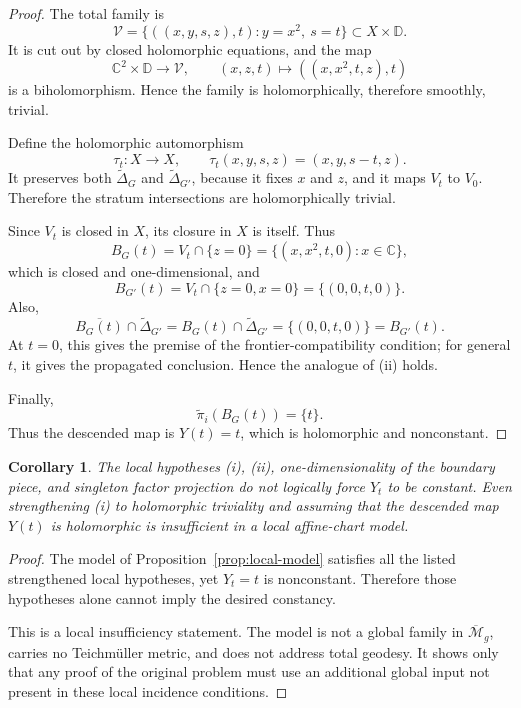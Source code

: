 \documentclass[12pt]{article}
\theoremstyle{plain}
\newtheorem{corollary}[theorem]{Corollary}
\theoremstyle{definition}
\theoremstyle{remark}
\newcommand{\D}{\mathbb D}
\newcommand{\C}{\mathbb C}
\newcommand{\M}{\mathcal M}
\newcommand{\bMg}{\overline{\M}_g}
\begin{document}
\begin{proof}
The total family is
\[
\mathcal V=\{((x,y,s,z),t): y=x^2,\ s=t\}\subset X\times \D.
\]
It is cut out by closed holomorphic equations, and the map
\[
\C^2\times\D\to \mathcal V,\qquad (x,z,t)\mapsto ((x,x^2,t,z),t)
\]
is a biholomorphism.  Hence the family is holomorphically, therefore smoothly, trivial.

Define the holomorphic automorphism
\[
\tau_t:X\to X,\qquad \tau_t(x,y,s,z)=(x,y,s-t,z).
\]
It preserves both \(\widetilde\Delta_G\) and \(\widetilde\Delta_{G'}\), because it fixes \(x\) and \(z\), and it maps \(V_t\) to \(V_0\).  Therefore the stratum intersections are holomorphically trivial.

Since \(V_t\) is closed in \(X\), its closure in \(X\) is itself.  Thus
\[
B_G(t)=V_t\cap \{z=0\}
=
\{(x,x^2,t,0):x\in\C\},
\]
which is closed and one-dimensional, and
\[
B_{G'}(t)=V_t\cap \{z=0,x=0\}
=
\{(0,0,t,0)\}.
\]
Also,
\[
\overline{B_G(t)}\cap \widetilde\Delta_{G'}
=
B_G(t)\cap \widetilde\Delta_{G'}
=
\{(0,0,t,0)\}
=
B_{G'}(t).
\]
At \(t=0\), this gives the premise of the frontier-compatibility condition; for general \(t\), it gives the propagated conclusion.  Hence the analogue of (ii) holds.

Finally,
\[
\widetilde\pi_i(B_G(t))=\{t\}.
\]
Thus the descended map is \(Y(t)=t\), which is holomorphic and nonconstant.
\end{proof}

\begin{corollary}\label{cor:holomorphic-insufficiency}
The local hypotheses (i), (ii), one-dimensionality of the boundary piece, and singleton factor projection do not logically force \(Y_t\) to be constant.  Even strengthening (i) to holomorphic triviality and assuming that the descended map \(Y(t)\) is holomorphic is insufficient in a local affine-chart model.
\end{corollary}

\begin{proof}
The model of Proposition~\ref{prop:local-model} satisfies all the listed strengthened local hypotheses, yet \(Y_t=t\) is nonconstant.  Therefore those hypotheses alone cannot imply the desired constancy.

This is a local insufficiency statement.  The model is not a global family in \(\bMg\), carries no Teichmüller metric, and does not address total geodesy.  It shows only that any proof of the original problem must use an additional global input not present in these local incidence conditions.
\end{proof}
\end{document}

